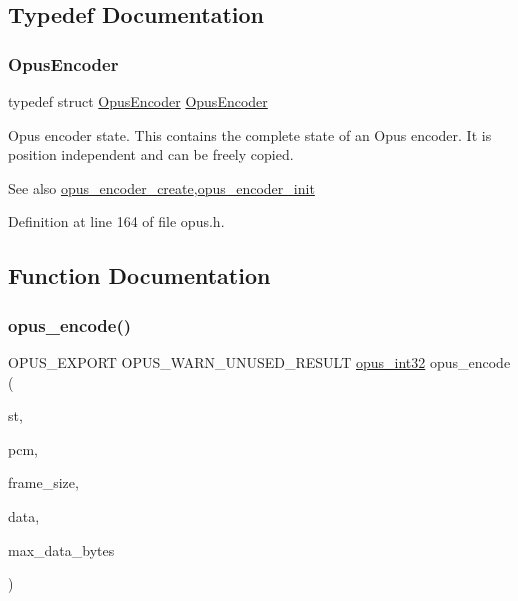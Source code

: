 \subsection{Typedef Documentation}
\mbox{\label{group__opus__encoder_gaf461a3ef2f10c2fe8b994a176f06c9bd}} 
\subsubsection{\texorpdfstring{OpusEncoder}{OpusEncoder}}
{\footnotesize\ttfamily typedef struct \mbox{\hyperlink{group__opus__encoder_gaf461a3ef2f10c2fe8b994a176f06c9bd}{Opus\+Encoder}} \mbox{\hyperlink{group__opus__encoder_gaf461a3ef2f10c2fe8b994a176f06c9bd}{Opus\+Encoder}}}

Opus encoder state. This contains the complete state of an Opus encoder. It is position independent and can be freely copied. \begin{DoxySeeAlso}{See also}
\mbox{\hyperlink{group__opus__encoder_ga8a145618886fed2d6fbc79a4071a939d}{opus\+\_\+encoder\+\_\+create}},\mbox{\hyperlink{group__opus__encoder_ga363e90db0f434b2d8fde7dcf989270b1}{opus\+\_\+encoder\+\_\+init}} 
\end{DoxySeeAlso}


Definition at line 164 of file opus.\+h.



\subsection{Function Documentation}
\mbox{\label{group__opus__encoder_gabbb51305050b64614329637d6eff777c}} 
\subsubsection{\texorpdfstring{opus\_encode()}{opus\_encode()}}
{\footnotesize\ttfamily O\+P\+U\+S\+\_\+\+E\+X\+P\+O\+RT O\+P\+U\+S\+\_\+\+W\+A\+R\+N\+\_\+\+U\+N\+U\+S\+E\+D\+\_\+\+R\+E\+S\+U\+LT \mbox{\hyperlink{opus__types_8h_aa4d309d6f80b99dbabebc8f98879ab9a}{opus\+\_\+int32}} opus\+\_\+encode (\begin{DoxyParamCaption}\item[{\mbox{\hyperlink{group__opus__encoder_gaf461a3ef2f10c2fe8b994a176f06c9bd}{Opus\+Encoder}} $\ast$}]{st,  }\item[{const \mbox{\hyperlink{opus__types_8h_acc9ed7cf60479eb81f9648c6ec27dc26}{opus\+\_\+int16}} $\ast$}]{pcm,  }\item[{int}]{frame\+\_\+size,  }\item[{unsigned char $\ast$}]{data,  }\item[{\mbox{\hyperlink{opus__types_8h_aa4d309d6f80b99dbabebc8f98879ab9a}{opus\+\_\+int32}}}]{max\+\_\+data\+\_\+bytes }\end{DoxyParamCaption})}

